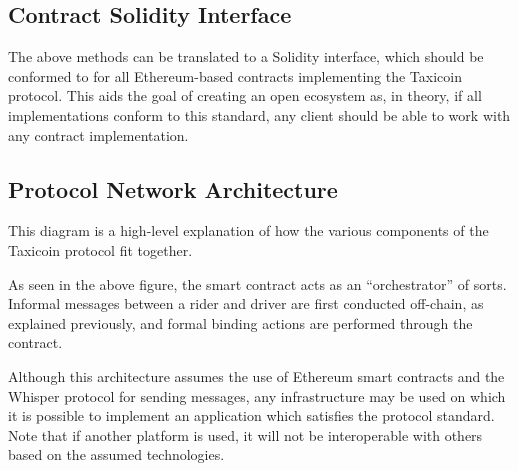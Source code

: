 

\subsection{Contract Solidity Interface}

The above methods can be translated to a Solidity interface, which should be conformed to for all Ethereum-based contracts implementing the Taxicoin protocol. This aids the goal of creating an open ecosystem as, in theory, if all implementations conform to this standard, any client should be able to work with any contract implementation.



\subsection{Protocol Network Architecture}

This diagram is a high-level explanation of how the various components of the Taxicoin protocol fit together.

\begin{figure*}[h!]
\centering
{}
\end{figure*}

As seen in the above figure, the smart contract acts as an \enquote{orchestrator} of sorts. Informal messages between a rider and driver are first conducted off-chain, as explained previously, and formal binding actions are performed through the contract.

Although this architecture assumes the use of Ethereum smart contracts and the Whisper protocol for sending messages, any infrastructure may be used on which it is possible to implement an application which satisfies the protocol standard. Note that if another platform is used, it will not be interoperable with others based on the assumed technologies.

